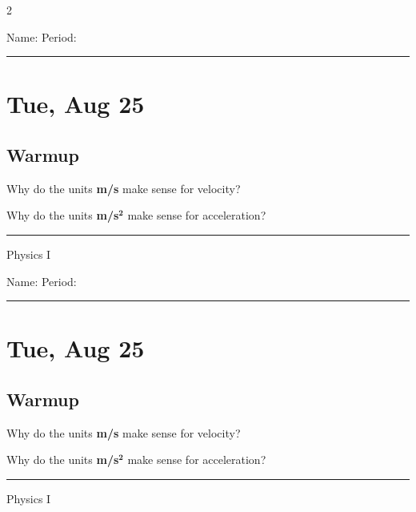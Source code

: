 \documentclass[10pt,landscape]{exam}
\def\todayDate{Tue, Aug 25}
\def\content{
\begin{questions}
  \question Why do the units \textbf{m/s} make sense for velocity? \vs 

  \question Why do the units \textbf{m/s$^\mathbf{2}$} make sense for acceleration? \vs 
\end{questions}
}
\begin{document}
\pagestyle{empty}

\setlength{\columnsep}{0.8in}
\begin{multicols*}{2}

\noindent  
Name: \hfill Period: \hspace{5em}
\vspace{0.5em}
\hrule

\section*{\todayDate}
\subsection*{Warmup}

\content

\vfill
\hrule
\vspace{0.5em}
\hfill {\sc Physics I}

\columnbreak

\noindent  
Name: \hfill Period: \hspace{5em}
\vspace{0.5em}
\hrule

\section*{\todayDate}
\subsection*{Warmup}

\content

\vfill
\hrule
\vspace{0.5em}
\hfill {\sc Physics I}

\end{multicols*}
\end{document}
